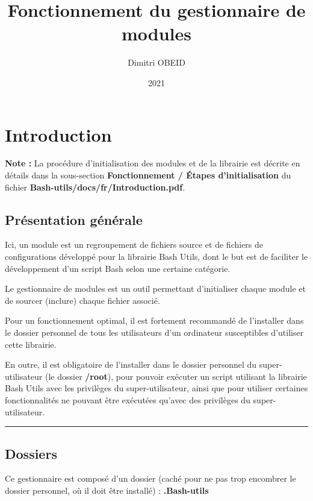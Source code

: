 \documentclass[a4paper,10pt]{article}
\title{\color{red}Fonctionnement du gestionnaire de modules}\color{white}
\author{Dimitri OBEID}
\date{2021}
\begin{document}
 \maketitle
 \tableofcontents
 \newpage

 \color{red}
 \section{Introduction}\color{white}

 \textbf{Note :} La procédure d'initialisation des modules et de la librairie est décrite en détails dans la sous-section \textbf{\color{red}Fonctionnement \color{white} / \color{green}Étapes d'initialisation\color{white}} du fichier \textbf{\color{lime}Bash-utils/docs/fr/Introduction.pdf\color{white}}.

 \color{green}
  \subsection{Présentation générale}\color{white}
  Ici, un module est un regroupement de fichiers source et de fichiers de configurations développé pour la librairie Bash Utils, dont le but est de faciliter le développement d'un script Bash selon une certaine catégorie.\linebreak

  Le gestionnaire de modules est un outil permettant d'initialiser chaque module et de sourcer (inclure) chaque fichier associé.\linebreak

  Pour un fonctionnement optimal, il est fortement recommandé de l'installer dans le dossier personnel de tous les utilisateurs d'un ordinateur susceptibles d'utiliser cette librairie.\linebreak

  En outre, il est obligatoire de l'installer dans le dossier personnel du super-utilisateur (le dossier \textbf{\color{lime}/root\color{white}}), pour pouvoir exécuter un script utilisant la librairie Bash Utils avec les privilèges du super-utilisateur, ainsi que pour utiliser certaines fonctionnalités ne pouvant être exécutées qu'avec des privilèges du super-utilisateur.\\[1\baselineskip]



  \color{green}\par\noindent\rule{\textwidth}{0.4pt}\color{white}

  \color{green}
  \subsection{Dossiers}\color{white}
  Ce gestionnaire est composé d'un dossier (caché pour ne pas trop encombrer le dossier personnel, où il doit être installé) : \textbf{\color{lime}.Bash-utils\color{white}}\linebreak
  
\end{document}
